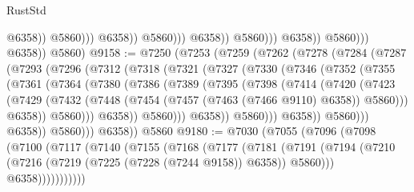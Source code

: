 \begin{lexlean}{RustStd}
\begin{coremodule}
                                                  @6358))
                                              @5860)))
                                        @6358))
                                    @5860)))
                              @6358))
                          @5860)))
                    @6358))
                @5860)))
          @6358))
      @5860)
@9158 := @7250
    (@7253
      (@7259
        (@7262
          (@7278
            (@7284
              (@7287
                (@7293
                  (@7296
                    (@7312
                      (@7318
                        (@7321
                          (@7327
                            (@7330
                              (@7346
                                (@7352
                                  (@7355
                                    (@7361
                                      (@7364
                                        (@7380
                                          (@7386
                                            (@7389
                                              (@7395
                                                (@7398
                                                  (@7414
                                                    (@7420
                                                      (@7423
                                                        (@7429
                                                          (@7432
                                                            (@7448
                                                              (@7454
                                                                (@7457 (@7463 (@7466 @9110) @6358))
                                                                @5860)))
                                                          @6358))
                                                      @5860)))
                                                @6358))
                                            @5860)))
                                      @6358))
                                  @5860)))
                            @6358))
                        @5860)))
                  @6358))
              @5860)))
        @6358))
    @5860
@9180 := @7030
    (@7055
      (@7096
        (@7098
          (@7100
            (@7117
              (@7140
                (@7155
                  (@7168
                    (@7177
                      (@7181
                        (@7191
                          (@7194 (@7210 (@7216 (@7219 (@7225 (@7228 (@7244 @9158)) @6358)) @5860)))
                          @6358)))))))))))

\end{coremodule}
\end{lexlean}
